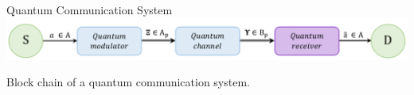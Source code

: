 \begin{frame}{Quantum Communication System}
    \includegraphics[width=1\textwidth]{Pictures/fig3.0.pdf}
    \begin{center}
        {\scriptsize 
        Block chain of a quantum communication system.
        }
    \end{center}
\end{frame}